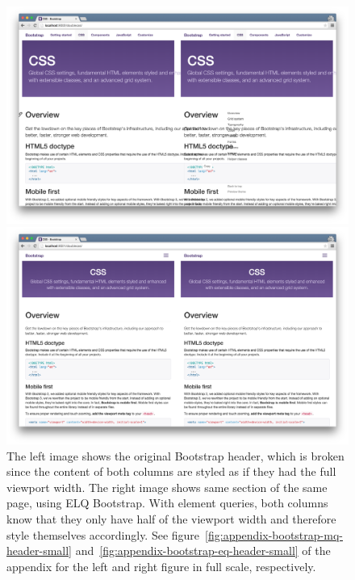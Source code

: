 \documentclass[a4paper,11pt]{kth-mag}
\begin{document}
      \begin{figure}[hp!]
        \centering
        \begin{minipage}{.5\textwidth}
          \centering
          \includegraphics[width=\linewidth]{images/bootstrap-mq-header-small}
        \end{minipage}%
        \begin{minipage}{.5\textwidth}
          \centering
          \includegraphics[width=\linewidth]{images/bootstrap-eq-header-small}
        \end{minipage}
        \caption{
          The left image shows the original \gls{Bootstrap} header, which is broken since the content of both columns are styled as if they had the full \gls{viewport} width.
          The right image shows same section of the same page, using \gls{ELQ} \gls{Bootstrap}.
          With element queries, both columns know that they only have half of the \gls{viewport} width and therefore style themselves accordingly.
          See figure~\ref{fig:appendix-bootstrap-mq-header-small} and~\ref{fig:appendix-bootstrap-eq-header-small} of the appendix for the left and right figure in full scale, respectively.}
        \label{fig:eval-bootstrap-mq-eq-header}
      \end{figure}
\end{document}
